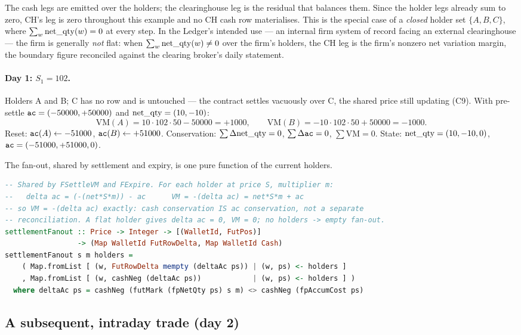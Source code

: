 \noindent The cash legs are emitted over the holders; the clearinghouse leg is the residual that
balances them. Since the holder legs already sum to zero, CH's leg is zero throughout this example and
no CH cash row materialises. This is the special case of a \emph{closed} holder set $\{A,B,C\}$, where
$\sum_w\mathrm{net\_qty}(w)=0$ at every step. In the Ledger's intended use --- an internal firm system of record
facing an external clearinghouse --- the firm is generally \emph{not} flat: when $\sum_w\mathrm{net\_qty}(w)\ne 0$
over the firm's holders, the CH leg is the firm's nonzero net variation margin, the boundary figure
reconciled against the clearing broker's daily statement.

\paragraph{Day 1: $S_1=102$.} Holders A and B; C has no row and is untouched --- the contract settles
vacuously over C, the shared price still updating (C9). With pre-settle $\texttt{ac}=(-50000,+50000)$ and
$\mathrm{net\_qty}=(10,-10)$:
\[
\mathrm{VM}(A) = 10\cdot 102\cdot 50 - 50000 = +1000,\qquad
\mathrm{VM}(B) = -10\cdot 102\cdot 50 + 50000 = -1000.
\]
Reset: $\texttt{ac}(A)\leftarrow -51000$, $\texttt{ac}(B)\leftarrow +51000$. Conservation: $\sum\Delta\mathrm{net\_qty}=0$,
$\sum\Delta\texttt{ac} = 0$, $\sum\mathrm{VM}=0$. State: $\mathrm{net\_qty}=(10,-10,0)$, $\texttt{ac}=(-51000,+51000,0)$.

The fan-out, shared by settlement and expiry, is one pure function of the current holders.

\begin{lstlisting}[language=Haskell]
-- Shared by FSettleVM and FExpire. For each holder at price S, multiplier m:
--   delta ac = (-(net*S*m)) - ac      VM = -(delta ac) = net*S*m + ac
-- so VM = -(delta ac) exactly: cash conservation IS ac conservation, not a separate
-- reconciliation. A flat holder gives delta ac = 0, VM = 0; no holders -> empty fan-out.
settlementFanout :: Price -> Integer -> [(WalletId, FutPos)]
                 -> (Map WalletId FutRowDelta, Map WalletId Cash)
settlementFanout s m holders =
    ( Map.fromList [ (w, FutRowDelta mempty (deltaAc ps)) | (w, ps) <- holders ]
    , Map.fromList [ (w, cashNeg (deltaAc ps))            | (w, ps) <- holders ] )
  where deltaAc ps = cashNeg (futMark (fpNetQty ps) s m) <> cashNeg (fpAccumCost ps)
\end{lstlisting}

\subsection{A subsequent, intraday trade (day 2)}

